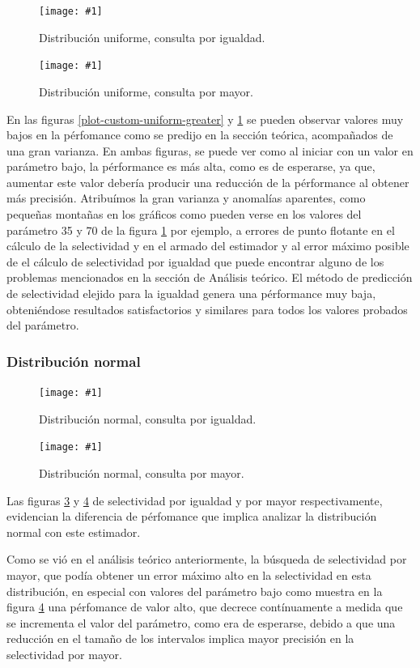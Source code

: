 \documentclass[a4paper, 10pt, twoside]{article}
\newcommand{\grafico}[3]{
  \begin{figure}[H]
    \texttt{[image: \#1]}
    \caption{#2}
    \label{#3}
  \end{figure}
}
\begin{document}
\grafico{plot-hist-uniform-equal}
        {Distribución uniforme, consulta por igualdad.}
        {plot-hist-uniform-equal}
\grafico{plot-hist-uniform-greater}
        {Distribución uniforme, consulta por mayor.}
        {plot-hist-uniform-greater}

En las figuras \ref{plot-custom-uniform-greater} y \ref{plot-hist-uniform-equal} se pueden observar valores muy bajos
en la pérfomance como se predijo en la sección teórica, acompañados de una gran varianza. En ambas figuras, se puede ver como al iniciar con un valor en parámetro bajo,
la pérformance es más alta, como es de esperarse, ya que, aumentar este valor debería producir una reducción de la pérformance al obtener más precisión.
Atribuímos la gran varianza y anomalías aparentes, como pequeñas montañas en los gráficos como pueden verse en los
valores del parámetro 35 y 70 de la figura \ref{plot-hist-uniform-equal} por ejemplo, a errores de punto flotante en el cálculo de la selectividad y en el armado del estimador y al error máximo posible de el cálculo de selectividad por igualdad que puede encontrar alguno de los problemas mencionados en la sección de Análisis teórico.
El método de predicción de selectividad elejido para la igualdad genera una pérformance muy baja, obteniéndose resultados satisfactorios y similares para todos los valores probados del parámetro.

\subsubsection{Distribución normal}


\grafico{plot-hist-normal-equal}
        {Distribución normal, consulta por igualdad.}
        {plot-hist-normal-equal}
\grafico{plot-hist-normal-greater}
        {Distribución normal, consulta por mayor.}
        {plot-hist-normal-greater}

Las figuras \ref{plot-hist-normal-equal} y \ref{plot-hist-normal-greater} de selectividad por igualdad y por mayor respectivamente, evidencian la diferencia 
de pérfomance que implica analizar la distribución normal con este estimador.

Como se vió en el análisis teórico anteriormente, la búsqueda de selectividad por mayor, que podía obtener un error máximo 
alto en la selectividad en esta distribución, en especial con valores del parámetro bajo como muestra en la figura \ref{plot-hist-normal-greater} una pérfomance de valor alto, que decrece contínuamente a medida que se incrementa el valor del parámetro, como era de esperarse, debido a que una reducción en el tamaño de los intervalos implica mayor precisión en la selectividad por mayor.
\end{document}
